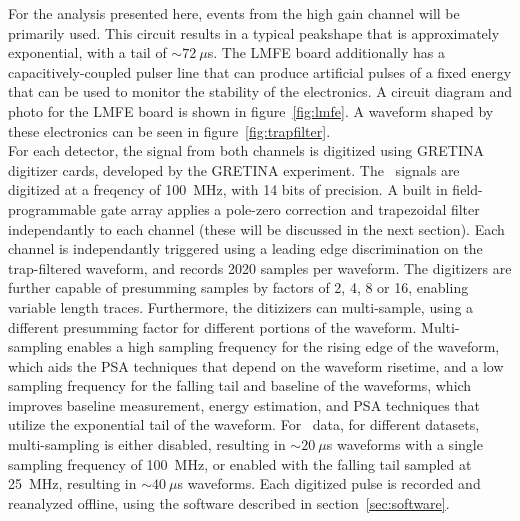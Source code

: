\documentclass[/main.tex]{subfiles}
\begin{document}
For the analysis presented here, events from the high gain channel will be primarily used.
This circuit results in a typical peakshape that is approximately exponential, with a tail of $\sim72~\mu$s.
The LMFE board additionally has a capacitively-coupled pulser line that can produce artificial pulses of a fixed energy that can be used to monitor the stability of the electronics.
A circuit diagram and photo for the LMFE board is shown in figure~\ref{fig:lmfe}.
A waveform shaped by these electronics can be seen in figure~\ref{fig:trapfilter}.
\\
For each detector, the signal from both channels is digitized using GRETINA digitizer cards, developed by the GRETINA experiment\cite{zimmermann2012}.
The \MJD\ signals are digitized at a freqency of 100~MHz, with 14 bits of precision.
A built in field-programmable gate array applies a pole-zero correction and trapezoidal filter independantly to each channel (these will be discussed in the next section).
Each channel is independantly triggered using a leading edge discrimination on the trap-filtered waveform, and records 2020 samples per waveform.
The digitizers are further capable of presumming samples by factors of 2, 4, 8 or 16, enabling variable length traces.
Furthermore, the ditizizers can multi-sample, using a different presumming factor for different portions of the waveform.
Multi-sampling enables a high sampling frequency for the rising edge of the waveform, which aids the PSA techniques that depend on the waveform risetime, and a low sampling frequency for the falling tail and baseline of the waveforms, which improves baseline measurement, energy estimation, and PSA techniques that utilize the exponential tail of the waveform.
For \MJD\ data, for different datasets, multi-sampling is either disabled, resulting in $\sim20~\mu$s waveforms with a single sampling frequency of 100~MHz, or enabled with the falling tail sampled at 25~MHz, resulting in $\sim40~\mu$s waveforms.
Each digitized pulse is recorded and reanalyzed offline, using the software described in section~\ref{sec:software}.
\\
\end{document}
